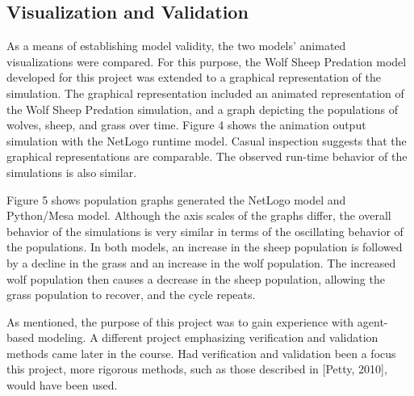 
\begin{multicols}{2}

\subsection{Visualization and Validation}\label{subsec:visualization-and-validation}
    As a means of establishing model validity, the two models' animated
    visualizations were compared.
    For this purpose, the Wolf Sheep Predation model developed for this
    project was extended to a graphical representation of the simulation.
    The graphical representation included an animated representation of the
    Wolf Sheep Predation simulation, and a graph depicting the populations
    of wolves, sheep, and grass over time.
    Figure 4 shows the animation output simulation with the NetLogo runtime model.
    Casual inspection suggests that the graphical representations are comparable.
    The observed run-time behavior of the simulations is also similar.


    Figure 5 shows population graphs generated the NetLogo model and Python/Mesa model.
    Although the axis scales of the graphs differ, the overall behavior of the simulations
    is very similar in terms of the oscillating behavior of the populations.
    In both models, an increase in the sheep population is followed by a decline
    in the grass and an increase in the wolf population.
    The increased wolf population then causes a decrease in the sheep population,
    allowing the grass population to recover, and the cycle repeats.

    As mentioned, the purpose of this project was to gain experience with
    agent-based modeling.
    A different project emphasizing verification and validation methods came later
    in the course.
    Had verification and validation been a focus this project, more rigorous methods,
    such as those described in [Petty, 2010], would have been used.


\end{multicols}
